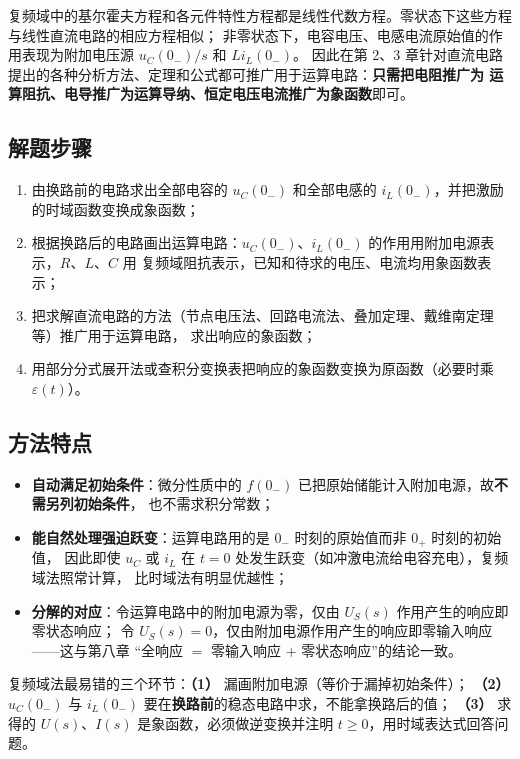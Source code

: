 复频域中的基尔霍夫方程和各元件特性方程都是线性代数方程。零状态下这些方程与线性直流电路的相应方程相似；
非零状态下，电容电压、电感电流原始值的作用表现为附加电压源 $u_C(0_-)/s$ 和 $Li_L(0_-)$。
因此在第 2、3 章针对直流电路提出的各种分析方法、定理和公式都可推广用于运算电路：\textbf{只需把电阻推广为
运算阻抗、电导推广为运算导纳、恒定电压电流推广为象函数}即可。

\subsection{解题步骤}
\begin{enumerate}
  \item 由换路前的电路求出全部电容的 $u_C(0_-)$ 和全部电感的 $i_L(0_-)$，并把激励的时域函数变换成象函数；
  \item 根据换路后的电路画出运算电路：$u_C(0_-)$、$i_L(0_-)$ 的作用用附加电源表示，$R$、$L$、$C$ 用
        复频域阻抗表示，已知和待求的电压、电流均用象函数表示；
  \item 把求解直流电路的方法（节点电压法、回路电流法、叠加定理、戴维南定理等）推广用于运算电路，
        求出响应的象函数；
  \item 用部分分式展开法或查积分变换表把响应的象函数变换为原函数（必要时乘 $\varepsilon(t)$）。
\end{enumerate}

\subsection{方法特点}
\begin{itemize}
  \item \textbf{自动满足初始条件}：微分性质中的 $f(0_-)$ 已把原始储能计入附加电源，故\textbf{不需另列初始条件}，
        也不需求积分常数；
  \item \textbf{能自然处理强迫跃变}：运算电路用的是 $0_-$ 时刻的原始值而非 $0_+$ 时刻的初始值，
        因此即使 $u_C$ 或 $i_L$ 在 $t=0$ 处发生跃变（如冲激电流给电容充电），复频域法照常计算，
        比时域法有明显优越性；
  \item \textbf{分解的对应}：令运算电路中的附加电源为零，仅由 $U_S(s)$ 作用产生的响应即零状态响应；
        令 $U_S(s)=0$，仅由附加电源作用产生的响应即零输入响应——这与第八章
        “全响应 $=$ 零输入响应 $+$ 零状态响应”的结论一致。
\end{itemize}

\begin{corepoint}{复频域法最易错的三个环节：\textbf{（1）} 漏画附加电源（等价于漏掉初始条件）；
\textbf{（2）} $u_C(0_-)$ 与 $i_L(0_-)$ 要在\textbf{换路前}的稳态电路中求，不能拿换路后的值；
\textbf{（3）} 求得的 $U(s)$、$I(s)$ 是象函数，必须做逆变换并注明 $t\ge0$，用时域表达式回答问题。}
\end{corepoint}

